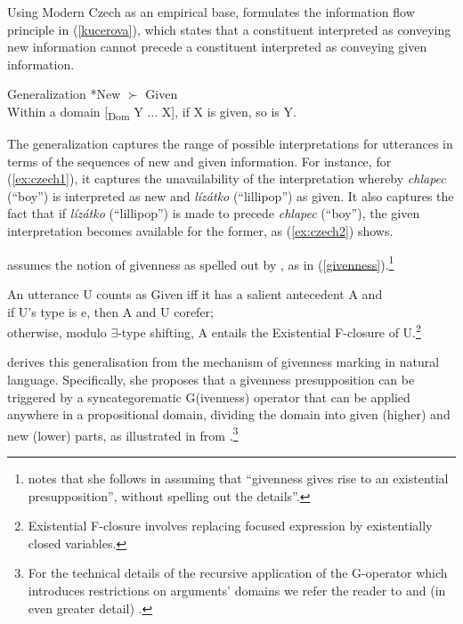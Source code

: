 \documentclass[output=paper,modfonts,nonflat]{langsci/langscibook}
\begin{document}
Using Modern Czech as an empirical base, \citet{Kucerova:2012} formulates the information flow principle in (\ref{kucerova}), which states that a constituent interpreted as conveying new information cannot precede a constituent interpreted as conveying given information. 

\ea \label{kucerova}
Generalization *New $\succ$ Given \\
Within a domain [\textsubscript{Dom} Y ... X], if X is given, so is Y. \hfill \citet[14]{Kucerova:2012}
\z

The generalization captures the range of possible interpretations for utterances in terms of the sequences of new and given information. For instance, for (\ref{ex:czech1}), it captures the unavailability of the interpretation whereby {\itshape chlapec} (``boy'') is interpreted as new and {\itshape l\'{i}z\'{a}tko} (``lillipop'') as given. It also captures the fact that if {\itshape l\'{i}z\'{a}tko} (``lillipop'') is made to precede {\itshape chlapec} (``boy''), the given interpretation becomes available for the former, as (\ref{ex:czech2}) shows.

\citet[18]{Kucerova:2012} assumes the notion of givenness as spelled out by \citet[151]{Schwarzschild:1999}, as in (\ref{givenness}).\footnote{\citet[18]{Kucerova:2012} notes that she follows \citealt{Sauerland:2005} in assuming that ``givenness gives rise to an existential presupposition'', without spelling out the details''.}

\ea\label{givenness}
An utterance U counts as Given iff it has a salient antecedent A and\\
\ea if U's type is e, then A and U corefer;\\
\ex otherwise, modulo $\exists$-type shifting, A entails the Existential F-closure of U.\footnote{Existential F-closure involves replacing focused expression by existentially closed variables.}
\z
\z

\citet[14]{Kucerova:2012} derives this generalisation from the mechanism of givenness marking in natural language. Specifically, she proposes that a givenness presupposition can be triggered by a syncategorematic G(ivenness) operator that can be applied anywhere in a propositional domain, dividing the domain into given (higher) and new (lower) parts, as illustrated in  from \citet[3]{Kucerova:2012}.\footnote{For the technical details of the recursive application of the G-operator which introduces restrictions on arguments' domains we refer the reader to \citet{Kucerova:2012} and (in even greater detail) \citet{SimikWierzba:2015}.}
\end{document}
